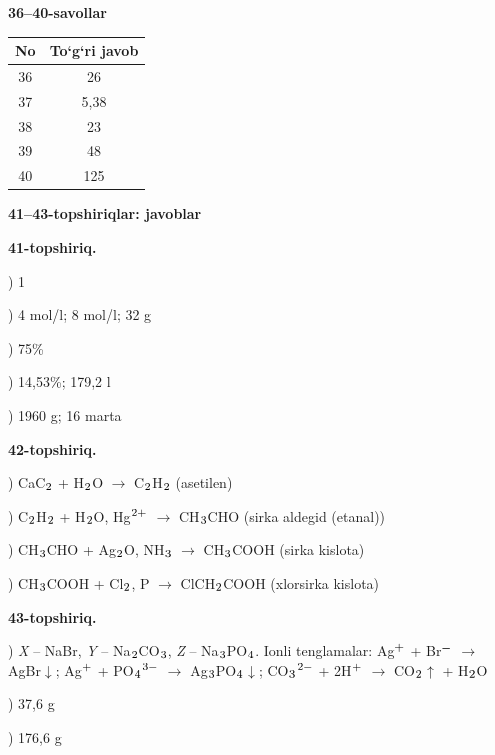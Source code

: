 \documentclass[11pt,a4paper]{article}
\renewcommand{\textsubscript}[1]{\ensuremath{_{\text{\fontsize{8}{8}\selectfont #1}}}}
\renewcommand{\textsuperscript}[1]{\ensuremath{^{\text{\fontsize{8}{8}\selectfont #1}}}}
\begin{document}
\noindent\textbf{36--40-savollar}\par\smallskip
\noindent\begin{tabular}{|c|c|}\hline \textbf{No} & \textbf{To`g`ri javob}\\\hline
36 & 26\\\hline
37 & 5,38\\\hline
38 & 23\\\hline
39 & 48\\\hline
40 & 125\\\hline
\end{tabular}\par\medskip
\noindent\textbf{41--43-topshiriqlar: javoblar}\par\smallskip
\noindent\textbf{41-topshiriq.}\par
{}) 1\par
{}) 4 mol/l; 8 mol/l; 32 g\par
{}) 75\%\par
{}) 14,53\%; 179,2 l\par
{}) 1960 g; 16 marta\par
\noindent\textbf{42-topshiriq.}\par
{}) CaC\textsubscript{2} + H\textsubscript{2}O $\to$ C\textsubscript{2}H\textsubscript{2} (asetilen)\par
{}) C\textsubscript{2}H\textsubscript{2} + H\textsubscript{2}O, Hg\textsuperscript{2+} $\to$ CH\textsubscript{3}CHO (sirka aldegid (etanal))\par
{}) CH\textsubscript{3}CHO + Ag\textsubscript{2}O, NH\textsubscript{3} $\to$ CH\textsubscript{3}COOH (sirka kislota)\par
{}) CH\textsubscript{3}COOH + Cl\textsubscript{2}, P $\to$ ClCH\textsubscript{2}COOH (xlorsirka kislota)\par
\noindent\textbf{43-topshiriq.}\par
{}) \textit{X} -- NaBr, \textit{Y} -- Na\textsubscript{2}CO\textsubscript{3}, \textit{Z} -- Na\textsubscript{3}PO\textsubscript{4}. Ionli tenglamalar: Ag\textsuperscript{+} + Br\textsuperscript{$-$} $\to$ AgBr$\downarrow$; Ag\textsuperscript{+} + PO\textsubscript{4}\textsuperscript{3$-$} $\to$ Ag\textsubscript{3}PO\textsubscript{4}$\downarrow$; CO\textsubscript{3}\textsuperscript{2$-$} + 2H\textsuperscript{+} $\to$ CO\textsubscript{2}$\uparrow$ + H\textsubscript{2}O\par
{}) 37,6 g\par
{}) 176,6 g\par
\end{document}
